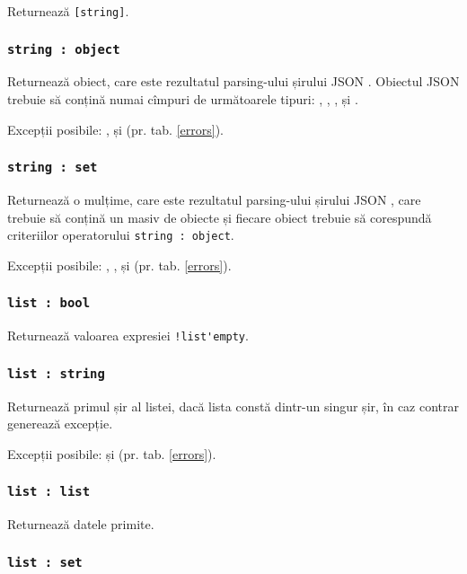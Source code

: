 Returnează \lstinline|[string]|.

\subsubsection{\lstinline|string : object|}

Returnează obiect, care este rezultatul parsing-ului șirului JSON \str. Obiectul JSON trebuie să conțină numai cîmpuri de următoarele tipuri: \bool, \integer, \double, \str{} și \listtype.

Excepții posibile: ,  și  (pr. tab. \ref{errors}).

\subsubsection{\lstinline|string : set|}

Returnează o mulțime, care este rezultatul parsing-ului șirului JSON \str, care trebuie să conțină un masiv de obiecte și fiecare obiect trebuie să corespundă criteriilor operatorului \lstinline|string : object|.

Excepții posibile: , ,  și  (pr. tab. \ref{errors}).

\subsubsection{\lstinline|list : bool|}

Returnează valoarea expresiei \lstinline|!list'empty|.

\subsubsection{\lstinline|list : string|}

Returnează primul șir al listei, dacă lista constă dintr-un singur șir, în caz contrar generează excepție.

Excepții posibile:  și  (pr. tab. \ref{errors}).

\subsubsection{\lstinline|list : list|}

Returnează datele primite.

\subsubsection{\lstinline|list : set|}

